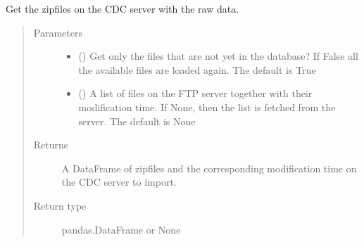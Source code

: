 \documentclass[letterpaper,10pt,english]{sphinxmanual}
\begin{document}
\begin{fulllineitems}
\begin{fulllineitems}
\label{\detokenize{weatherDB:weatherDB.station.StationBase.get_zipfiles}}
\sphinxAtStartPar
Get the zipfiles on the CDC server with the raw data.
\begin{quote}\begin{description}
\item[{Parameters}] \leavevmode\begin{itemize}
\item {} 
\sphinxAtStartPar
{} (\sphinxstyleliteralemphasis{\sphinxupquote{, }}) \textendash{} Get only the files that are not yet in the database?
If False all the available files are loaded again.
The default is True

\item {} 
\sphinxAtStartPar
{} (\sphinxstyleliteralemphasis{\sphinxupquote{ (}}\sphinxstyleliteralemphasis{\sphinxupquote{, }}\sphinxstyleliteralemphasis{\sphinxupquote{)}}\sphinxstyleliteralemphasis{\sphinxupquote{, }}) \textendash{} A list of files on the FTP server together with their modification time.
If None, then the list is fetched from the server.
The default is None

\end{itemize}

\item[{Returns}] \leavevmode
\sphinxAtStartPar
A DataFrame of zipfiles and the corresponding modification time on the CDC server to import.

\item[{Return type}] \leavevmode
\sphinxAtStartPar
pandas.DataFrame or None

\end{description}\end{quote}

\end{fulllineitems}



\end{fulllineitems}
\end{document}
